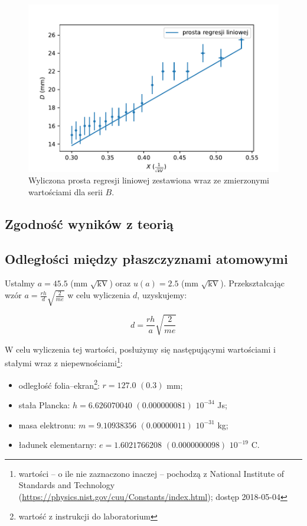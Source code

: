 \documentclass[a4paper]{article}
\newlength{\du}
\begin{document}
\begin{figure}[h]
\centering
\includegraphics[scale=0.7]{wykres_B.pdf}
\caption{Wyliczona prosta regresji liniowej zestawiona wraz ze zmierzonymi wartościami dla serii $B$.}
\label{wykres_B}
\end{figure}

\subsection{Zgodność wyników z teorią}

\subsection{Odległości między płaszczyznami atomowymi}

Ustalmy $a = 45.5$ (mm $\sqrt{\text{kV}}$) oraz $u(a) = 2.5$ (mm $\sqrt{\text{kV}}$).
Przekształcając wzór $a = \frac{rh}{d} \sqrt{\frac{2}{me}}$ w celu wyliczenia $d$, uzyskujemy:

$$d = \frac{rh}{a} \sqrt{\frac{2}{me}}$$

W celu wyliczenia tej wartości, posłużymy się następującymi wartościami i stałymi wraz z niepewnościami\footnote{wartości -- o ile nie zaznaczono inaczej -- pochodzą z National Institute of Standards and Technology (\url{https://physics.nist.gov/cuu/Constants/index.html}); dostęp 2018-05-04}:

\begin{itemize}
	\item odległość folia--ekran\footnote{wartość z instrukcji do laboratorium}: $r = 127.0$ $(0.3)$ mm;
	\item stała Plancka: $h = 6.626 070 040$ $(0.000 000 081)$ $10^{-34}$ Js;
	\item masa elektronu: $m = 9.109 383 56$ $(0.000 000 11)$ $10^{-31}$ kg;
	\item ładunek elementarny: $e = 1.602 176 6208$ $(0.000 000 0098)$ $10^{-19}$ C.
\end{itemize}
\end{document}
